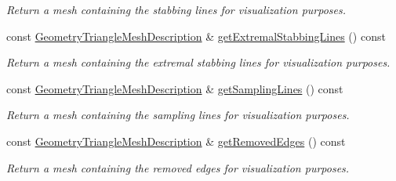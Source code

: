\begin{DoxyCompactItemize}
\begin{DoxyCompactList}\small\item\em Return a mesh containing the stabbing lines for visualization purposes. \end{DoxyCompactList}\item 
\mbox{\label{classvisilib_1_1_helper_visual_debugger_a03fadbe9593e26b7db63ceb31ed333cc}} 
const \mbox{\hyperlink{structvisilib_1_1_geometry_triangle_mesh_description}{Geometry\+Triangle\+Mesh\+Description}} \& \mbox{\hyperlink{classvisilib_1_1_helper_visual_debugger_a03fadbe9593e26b7db63ceb31ed333cc}{get\+Extremal\+Stabbing\+Lines}} () const
\begin{DoxyCompactList}\small\item\em Return a mesh containing the extremal stabbing lines for visualization purposes. \end{DoxyCompactList}\item 
\mbox{\label{classvisilib_1_1_helper_visual_debugger_ae245f0ee5073f39aeab7c3d1fe2c641d}} 
const \mbox{\hyperlink{structvisilib_1_1_geometry_triangle_mesh_description}{Geometry\+Triangle\+Mesh\+Description}} \& \mbox{\hyperlink{classvisilib_1_1_helper_visual_debugger_ae245f0ee5073f39aeab7c3d1fe2c641d}{get\+Sampling\+Lines}} () const
\begin{DoxyCompactList}\small\item\em Return a mesh containing the sampling lines for visualization purposes. \end{DoxyCompactList}\item 
\mbox{\label{classvisilib_1_1_helper_visual_debugger_a40f4cad545c59df00d0ad3c7e4ad5565}} 
const \mbox{\hyperlink{structvisilib_1_1_geometry_triangle_mesh_description}{Geometry\+Triangle\+Mesh\+Description}} \& \mbox{\hyperlink{classvisilib_1_1_helper_visual_debugger_a40f4cad545c59df00d0ad3c7e4ad5565}{get\+Removed\+Edges}} () const
\begin{DoxyCompactList}\small\item\em Return a mesh containing the removed edges for visualization purposes. \end{DoxyCompactList}\end{DoxyCompactItemize}
